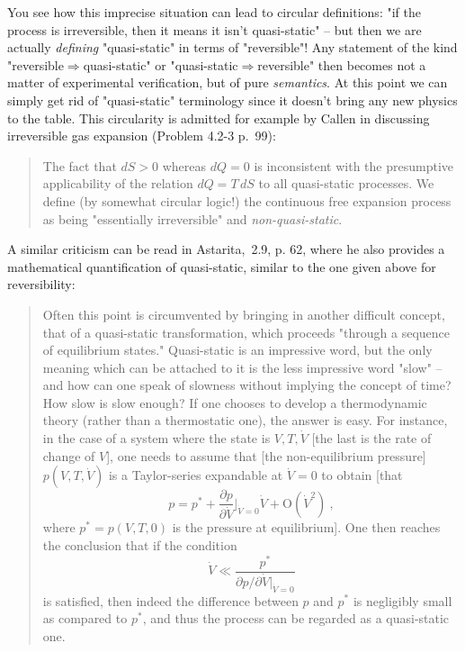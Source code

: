 You see how this imprecise situation can lead to circular definitions: "if the process is irreversible, then it means it isn't quasi-static" -- but then we are actually \emph{defining} "quasi-static" in terms of "reversible"! Any statement of the kind "reversible${}\Rightarrow{}$quasi-static" or "quasi-static${}\Rightarrow{}$reversible" then becomes not a matter of experimental verification, but of pure \emph{semantics}. At this point we can simply get rid of "quasi-static" terminology since it doesn't bring any new physics to the table. This circularity is admitted for example by Callen in discussing irreversible gas expansion (Problem 4.2-3 p.~99):

\begin{quote}
  The fact that $dS > 0$ whereas $dQ = 0$ is inconsistent with the presumptive applicability of the relation $dQ = T\,dS$ to all quasi-static processes. We define (by somewhat circular logic!) the continuous free expansion process as being "essentially irreversible" and \emph{non-quasi-static}.
\end{quote}

A similar criticism can be read in Astarita, \sect\,2.9, p. 62, where he also provides a mathematical quantification of quasi-static, similar to the one given above for reversibility:

\begin{quote}
  Often this point is circumvented by bringing in another difficult concept,
  that of a quasi-static transformation, which proceeds "through a sequence of
  equilibrium states." Quasi-static is an impressive word, but the only meaning
  which can be attached to it is the less impressive word "slow" -- and how can
  one speak of slowness without implying the concept of time? How slow is slow
  enough? If one chooses to develop a thermodynamic theory (rather than a
  thermostatic one), the answer is easy. For instance, in the case of a system where
  the state is $V, T, \dot{V}$ [the last is the rate of change of $V$], one needs to assume that [the non-equilibrium pressure] $p(V,T,\dot{V})$ is a Taylor-series expandable
  at $\dot{V} = 0$ to obtain [that
  $$
  p = p^* + \frac{\partial p}{\partial \dot{V}}\biggl\lvert_{\dot{V}=0}\dot{V} + \mathrm{O}(\dot{V}^2) \ ,
  $$
  where $p^* = p(V,T,0)$ is the pressure at equilibrium]. One then reaches the conclusion that if the
  condition
  $$\dot{V} \ll \frac{p^*}{\partial p/\partial \dot{V}\lvert_{\dot{V}=0}}
  $$
  is satisfied, then indeed the difference between $p$ and $p^*$ is negligibly small as compared to $p^*$, and thus the process can be regarded as a quasi-static one.
\end{quote}


